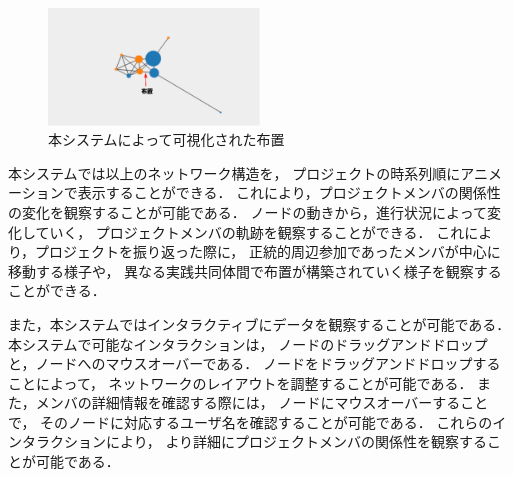 \begin{figure}[h]
  \centering
  \includegraphics[width=0.5\textwidth]{img/cop-map-overlap.eps}
  \caption{本システムによって可視化された布置}
  \label{cop-map-overlap}
\end{figure}

本システムでは以上のネットワーク構造を，
プロジェクトの時系列順にアニメーションで表示することができる．
これにより，プロジェクトメンバの関係性の変化を観察することが可能である．
ノードの動きから，進行状況によって変化していく，
プロジェクトメンバの軌跡を観察することができる．
これにより，プロジェクトを振り返った際に，
正統的周辺参加であったメンバが中心に移動する様子や，
異なる実践共同体間で布置が構築されていく様子を観察することができる．


また，本システムではインタラクティブにデータを観察することが可能である．
本システムで可能なインタラクションは，
ノードのドラッグアンドドロップと，ノードへのマウスオーバーである．
ノードをドラッグアンドドロップすることによって，
ネットワークのレイアウトを調整することが可能である．
また，メンバの詳細情報を確認する際には，
ノードにマウスオーバーすることで，
そのノードに対応するユーザ名を確認することが可能である．
これらのインタラクションにより，
より詳細にプロジェクトメンバの関係性を観察することが可能である．

